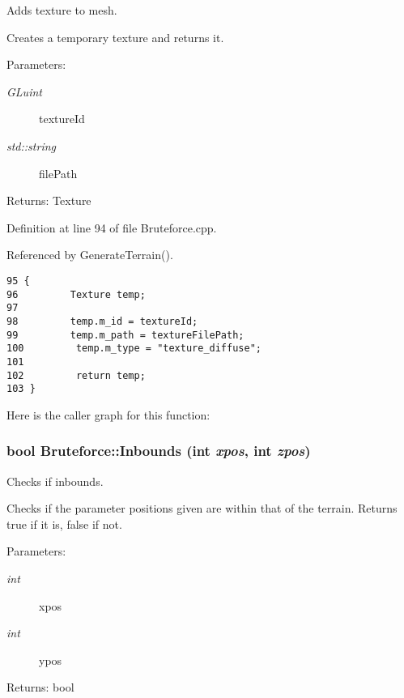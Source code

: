 Adds texture to mesh. 

Creates a temporary texture and returns it.

\begin{Desc}
\item[Parameters:]
\begin{description}
\item[{\em GLuint}]textureId \item[{\em std::string}]filePath \end{description}
\end{Desc}
\begin{Desc}
\item[Returns:]Texture \end{Desc}


Definition at line 94 of file Bruteforce.cpp.

Referenced by GenerateTerrain().

\begin{Code}\begin{verbatim}95 {
96         Texture temp;
97 
98         temp.m_id = textureId;
99         temp.m_path = textureFilePath;
100         temp.m_type = "texture_diffuse";
101 
102         return temp;
103 }
\end{verbatim}
\end{Code}




Here is the caller graph for this function:\hypertarget{class_bruteforce_2b337f6ef80b5722a09f2e0c381923ff}{
\subsubsection[Inbounds]{\setlength{\rightskip}{0pt plus 5cm}bool Bruteforce::Inbounds (int {\em xpos}, \/  int {\em zpos})}}
\label{class_bruteforce_2b337f6ef80b5722a09f2e0c381923ff}


Checks if inbounds. 

Checks if the parameter positions given are within that of the terrain. Returns true if it is, false if not.

\begin{Desc}
\item[Parameters:]
\begin{description}
\item[{\em int}]xpos \item[{\em int}]ypos \end{description}
\end{Desc}
\begin{Desc}
\item[Returns:]bool \end{Desc}


